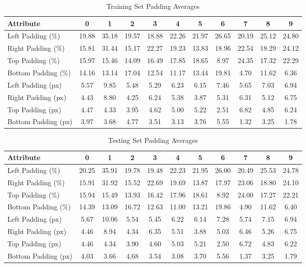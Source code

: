 
\begin{table}[h]
\centering
\begin{tabular}{lcccccccccc}
Attribute & 0 & 1 & 2 & 3 & 4 & 5 & 6 & 7 & 8 & 9 \\
\hline
Left Padding (\%) & 19.88 & 35.18 & 19.57 & 18.88 & 22.26 & 21.97 & 26.65 & 20.19 & 25.12 & 24.80 \\
Right Padding (\%) & 15.81 & 31.44 & 15.17 & 22.27 & 19.23 & 13.83 & 18.96 & 22.54 & 18.29 & 24.12 \\
Top Padding (\%) & 15.97 & 15.46 & 14.09 & 16.49 & 17.85 & 18.65 & 8.97 & 24.35 & 17.32 & 22.29 \\
Bottom Padding (\%) & 14.16 & 13.14 & 17.04 & 12.54 & 11.17 & 13.44 & 19.81 & 4.70 & 11.62 & 6.36 \\
Left Padding (px) & 5.57 & 9.85 & 5.48 & 5.29 & 6.23 & 6.15 & 7.46 & 5.65 & 7.03 & 6.94 \\
Right Padding (px) & 4.43 & 8.80 & 4.25 & 6.24 & 5.38 & 3.87 & 5.31 & 6.31 & 5.12 & 6.75 \\
Top Padding (px) & 4.47 & 4.33 & 3.95 & 4.62 & 5.00 & 5.22 & 2.51 & 6.82 & 4.85 & 6.24 \\
Bottom Padding (px) & 3.97 & 3.68 & 4.77 & 3.51 & 3.13 & 3.76 & 5.55 & 1.32 & 3.25 & 1.78 \\
\end{tabular}
\caption{Training Set Padding Averages}
\label{app:MNIST_Training_Dataset_pixel_padding_stats}
\end{table}

\begin{table}[h]
\centering
\begin{tabular}{lcccccccccc}
Attribute & 0 & 1 & 2 & 3 & 4 & 5 & 6 & 7 & 8 & 9 \\
\hline
Left Padding (\%) & 20.25 & 35.91 & 19.78 & 19.48 & 22.23 & 21.95 & 26.00 & 20.49 & 25.53 & 24.78 \\
Right Padding (\%) & 15.91 & 31.92 & 15.52 & 22.69 & 19.69 & 13.87 & 17.97 & 23.06 & 18.80 & 24.10 \\
Top Padding (\%) & 15.94 & 15.49 & 13.93 & 16.42 & 17.96 & 18.61 & 8.92 & 24.00 & 17.27 & 22.21 \\
Bottom Padding (\%) & 14.39 & 13.09 & 16.72 & 12.63 & 11.00 & 13.21 & 19.86 & 4.90 & 11.62 & 6.40 \\
Left Padding (px) & 5.67 & 10.06 & 5.54 & 5.45 & 6.22 & 6.14 & 7.28 & 5.74 & 7.15 & 6.94 \\
Right Padding (px) & 4.46 & 8.94 & 4.34 & 6.35 & 5.51 & 3.88 & 5.03 & 6.46 & 5.26 & 6.75 \\
Top Padding (px) & 4.46 & 4.34 & 3.90 & 4.60 & 5.03 & 5.21 & 2.50 & 6.72 & 4.83 & 6.22 \\
Bottom Padding (px) & 4.03 & 3.66 & 4.68 & 3.54 & 3.08 & 3.70 & 5.56 & 1.37 & 3.25 & 1.79 \\
\end{tabular}
\caption{Testing Set Padding Averages}
\label{app:MNIST_Testing_Dataset_pixel_padding_stats}
\end{table}


